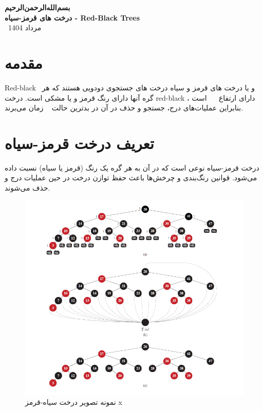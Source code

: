 \documentclass[a4paper,12pt]{article}
\begin{document}
	
	\thispagestyle{empty}  %
	
	\begin{center}
		{\Huge \textbf{بسم‌الله‌الرحمن‌الرحیم}}\\[2cm] %

		{\LARGE \textbf{درخت های قرمز-سیاه - Red-Black Trees}}\\[1cm] %

		{\large \ مرداد 1404}
	\end{center}
	
		\vspace{500pt}

	\tableofcontents
	\newpage
	
	\section{مقدمه}
	
	Red-black  و یا درخت های قرمز و سیاه درخت های جستجوی دودویی هستند که هر گره آنها دارای رنگ قرمز و یا مشکی است. درخت red-black دارای ارتفاع    است ، بنابراین عملیات‌های درج، جستجو و حذف در آن در بدترین حالت   زمان می‌برند.
	
	
	\section{تعریف درخت قرمز-سیاه}
	درخت قرمز-سیاه نوعی  است که در آن به هر گره یک رنگ (قرمز یا سیاه) نسبت داده می‌شود. قوانین رنگ‌بندی و چرخش‌ها باعث حفظ توازن درخت در حین عملیات درج و حذف می‌شوند.
	
	\begin{figure}[H]
		\centering
		\includegraphics[width=1\textwidth]{img/definition-example.png} %
		\caption{نمونه تصویر درخت سیاه-قرمز x}
	\end{figure}
	
\end{document}
